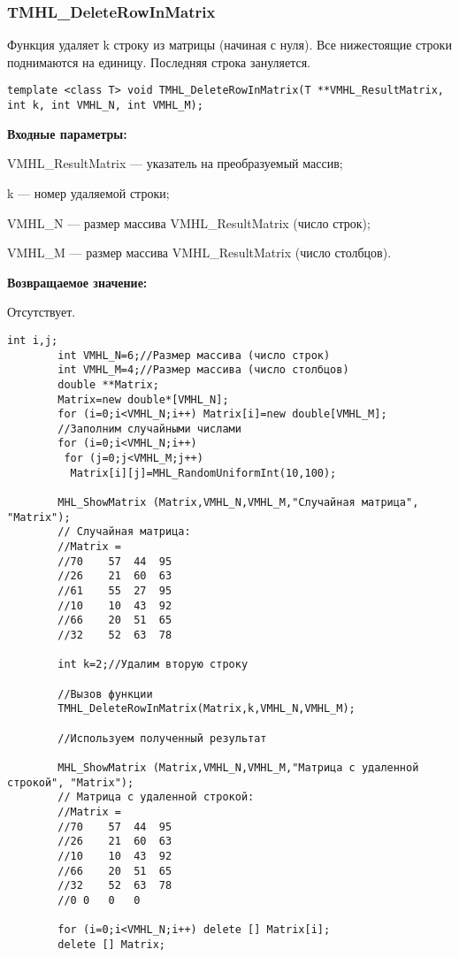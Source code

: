 \documentclass[a4paper,12pt]{article}
\begin{document}
\subsubsection{TMHL\_DeleteRowInMatrix}\label{TMHL_DeleteRowInMatrix}

Функция удаляет k строку из матрицы (начиная с нуля). Все нижестоящие строки поднимаются на единицу. Последняя строка зануляется.


\begin{lstlisting}[label=code_syntax_TMHL_DeleteRowInMatrix,caption=Синтаксис]
template <class T> void TMHL_DeleteRowInMatrix(T **VMHL_ResultMatrix, int k, int VMHL_N, int VMHL_M);
\end{lstlisting}

\textbf{Входные параметры:}  
 
VMHL\_ResultMatrix --- указатель на преобразуемый массив;
 
k --- номер удаляемой строки;
 
VMHL\_N --- размер массива VMHL\_ResultMatrix (число строк);
 
VMHL\_M --- размер массива VMHL\_ResultMatrix (число столбцов).

\textbf{Возвращаемое значение:}

Отсутствует.


\begin{lstlisting}[label=code_use_TMHL_DeleteRowInMatrix,caption=Пример использования]
        int i,j;
        int VMHL_N=6;//Размер массива (число строк)
        int VMHL_M=4;//Размер массива (число столбцов)
        double **Matrix;
        Matrix=new double*[VMHL_N];
        for (i=0;i<VMHL_N;i++) Matrix[i]=new double[VMHL_M];
        //Заполним случайными числами
        for (i=0;i<VMHL_N;i++)
         for (j=0;j<VMHL_M;j++)
          Matrix[i][j]=MHL_RandomUniformInt(10,100);

        MHL_ShowMatrix (Matrix,VMHL_N,VMHL_M,"Случайная матрица", "Matrix");
        // Случайная матрица:
        //Matrix =
        //70	57	44	95
        //26	21	60	63
        //61	55	27	95
        //10	10	43	92
        //66	20	51	65
        //32	52	63	78

        int k=2;//Удалим вторую строку

        //Вызов функции
        TMHL_DeleteRowInMatrix(Matrix,k,VMHL_N,VMHL_M);

        //Используем полученный результат

        MHL_ShowMatrix (Matrix,VMHL_N,VMHL_M,"Матрица с удаленной строкой", "Matrix");
        // Матрица с удаленной строкой:
        //Matrix =
        //70	57	44	95
        //26	21	60	63
        //10	10	43	92
        //66	20	51	65
        //32	52	63	78
        //0	0	0	0

        for (i=0;i<VMHL_N;i++) delete [] Matrix[i];
        delete [] Matrix;
\end{lstlisting}
\end{document}
